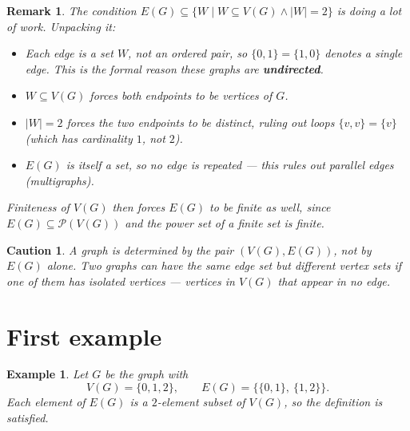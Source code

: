 \documentclass[11pt]{article}
\theoremstyle{defstyle}
\theoremstyle{thmstyle}
\theoremstyle{notstyle}
\newtheorem*{remark}{Remark}
\newtheorem*{example}{Example}
\theoremstyle{cautionstyle}
\newtheorem*{caution}{Caution}
\begin{document}
\begin{notebox}
\begin{remark}
The condition $E(G) \subseteq \{ W \mid W \subseteq V(G) \wedge |W| = 2 \}$
is doing a lot of work. Unpacking it:
\begin{itemize}[leftmargin=2em, itemsep=2pt]
  \item Each edge is a \emph{set} $W$, not an ordered pair, so
        $\{0, 1\} = \{1, 0\}$ denotes a single edge. This is the formal
        reason these graphs are \textbf{undirected}.
  \item $W \subseteq V(G)$ forces both endpoints to be vertices of $G$.
  \item $|W| = 2$ forces the two endpoints to be \emph{distinct}, ruling
        out loops $\{v, v\} = \{v\}$ (which has cardinality $1$, not $2$).
  \item $E(G)$ is itself a set, so no edge is repeated --- this rules out
        parallel edges (multigraphs).
\end{itemize}
Finiteness of $V(G)$ then forces $E(G)$ to be finite as well, since
$E(G) \subseteq \mathcal{P}(V(G))$ and the power set of a finite set is
finite.
\end{remark}
\end{notebox}

\begin{cautionbox}
\begin{caution}
A graph is determined by the \emph{pair} $(V(G), E(G))$, not by $E(G)$
alone. Two graphs can have the same edge set but different vertex sets if
one of them has \emph{isolated} vertices --- vertices in $V(G)$ that appear
in no edge.
\end{caution}
\end{cautionbox}

\section{First example}

\begin{notebox}
\begin{example}
Let $G$ be the graph with
\[
  V(G) = \{0, 1, 2\}, \qquad
  E(G) = \bigl\{ \{0, 1\},\ \{1, 2\} \bigr\}.
\]
Each element of $E(G)$ is a $2$-element subset of $V(G)$, so the definition
is satisfied.
\end{example}
\end{notebox}

\begin{center}
\end{center}
\end{document}
